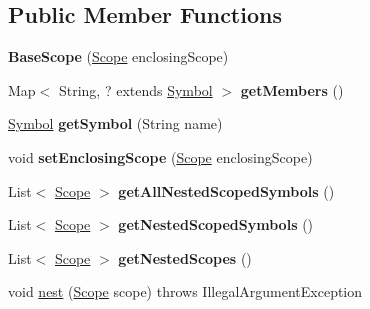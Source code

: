 \subsection*{Public Member Functions}
\begin{DoxyCompactItemize}
\item 
\mbox{\label{classlime_1_1antlr4_1_1BaseScope_a8ca5b696eb960331183f728abe8086dd}} 
{\bfseries Base\+Scope} (\hyperlink{interfacelime_1_1antlr4_1_1Scope}{Scope} enclosing\+Scope)
\item 
\mbox{\label{classlime_1_1antlr4_1_1BaseScope_ae9182f1b315cc947b4eaf3ac538a6480}} 
Map$<$ String, ? extends \hyperlink{interfacelime_1_1antlr4_1_1Symbol}{Symbol} $>$ {\bfseries get\+Members} ()
\item 
\mbox{\label{classlime_1_1antlr4_1_1BaseScope_a533c64421d34fe713263c587ebd7005b}} 
\hyperlink{interfacelime_1_1antlr4_1_1Symbol}{Symbol} {\bfseries get\+Symbol} (String name)
\item 
\mbox{\label{classlime_1_1antlr4_1_1BaseScope_a5fbd1a473713f803eec4604d071cb317}} 
void {\bfseries set\+Enclosing\+Scope} (\hyperlink{interfacelime_1_1antlr4_1_1Scope}{Scope} enclosing\+Scope)
\item 
\mbox{\label{classlime_1_1antlr4_1_1BaseScope_acdbbd2fea0ca793aa75d506b99f1bdd8}} 
List$<$ \hyperlink{interfacelime_1_1antlr4_1_1Scope}{Scope} $>$ {\bfseries get\+All\+Nested\+Scoped\+Symbols} ()
\item 
\mbox{\label{classlime_1_1antlr4_1_1BaseScope_a7bfdd5d3427f26887759f6e4ddc7497a}} 
List$<$ \hyperlink{interfacelime_1_1antlr4_1_1Scope}{Scope} $>$ {\bfseries get\+Nested\+Scoped\+Symbols} ()
\item 
\mbox{\label{classlime_1_1antlr4_1_1BaseScope_a6c3b48f4544d9bd317b3a276eef8b75d}} 
List$<$ \hyperlink{interfacelime_1_1antlr4_1_1Scope}{Scope} $>$ {\bfseries get\+Nested\+Scopes} ()
\item 
void \hyperlink{classlime_1_1antlr4_1_1BaseScope_abef111b3380ebe06ea7ee7f160dae1d5}{nest} (\hyperlink{interfacelime_1_1antlr4_1_1Scope}{Scope} scope)  throws Illegal\+Argument\+Exception 

\end{DoxyCompactItemize}
